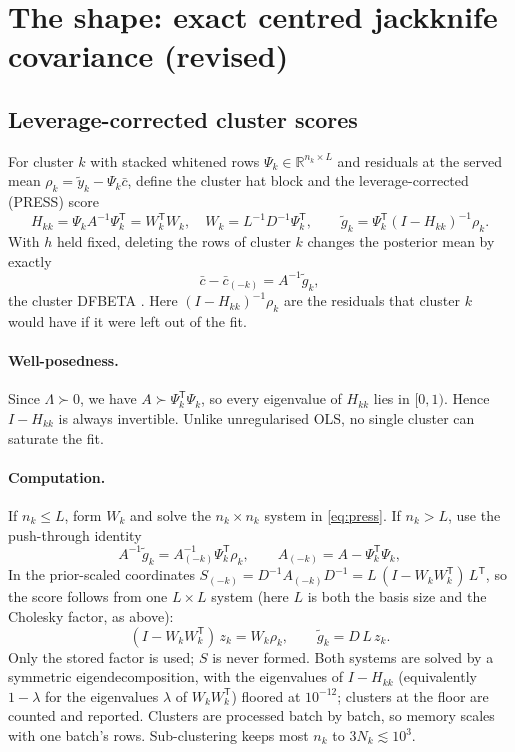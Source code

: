 \documentclass[11pt,a4paper]{article}
\newcommand{\R}{\mathbb{R}}
\newcommand{\T}{\mathsf{T}}
\newcommand{\cbar}{\bar{c}}
\newcommand{\gt}{\tilde{g}}
\begin{document}
\section{The shape: exact centred jackknife covariance (revised)}\label{sec:shape}

\subsection{Leverage-corrected cluster scores}
For cluster $k$ with stacked whitened rows $\Psi_k\in\R^{n_k\times L}$ and residuals at the served mean
$\rho_k=\tilde y_k-\Psi_k\cbar$, define the cluster hat block and the leverage-corrected (PRESS) score
\begin{equation}
H_{kk}=\Psi_kA^{-1}\Psi_k^\T = W_k^\T W_k,\quad W_k=L^{-1}D^{-1}\Psi_k^\T,\qquad
\gt_k=\Psi_k^\T(I-H_{kk})^{-1}\rho_k .
\label{eq:press}
\end{equation}
With $h$ held fixed, deleting the rows of cluster $k$ changes the posterior mean by exactly
\begin{equation}
\cbar-\cbar_{(-k)} = A^{-1}\gt_k,
\label{eq:dfbeta}
\end{equation}
the cluster DFBETA \cite{cook1982}. Here $(I-H_{kk})^{-1}\rho_k$ are the residuals that cluster $k$
would have if it were left out of the fit.

\paragraph{Well-posedness.} Since $\Lambda\succ0$, we have $A\succ\Psi_k^\T\Psi_k$, so every eigenvalue
of $H_{kk}$ lies in $[0,1)$. Hence $I-H_{kk}$ is always invertible. Unlike unregularised OLS, no single
cluster can saturate the fit.

\paragraph{Computation.} If $n_k\le L$, form $W_k$ and solve the $n_k\times n_k$ system in
\eqref{eq:press}. If $n_k>L$, use the push-through identity
\begin{equation}
A^{-1}\gt_k = A_{(-k)}^{-1}\Psi_k^\T\rho_k,\qquad A_{(-k)}=A-\Psi_k^\T\Psi_k,
\end{equation}
In the prior-scaled coordinates $S_{(-k)}=D^{-1}A_{(-k)}D^{-1}=L\,(I-W_kW_k^\T)\,L^\T$, so the score
follows from one $L\times L$ system (here $L$ is both the basis size and the Cholesky factor, as above):
\begin{equation}
(I-W_kW_k^\T)\,z_k=W_k\rho_k,\qquad \gt_k=D\,L\,z_k .
\end{equation}
Only the stored factor is used; $S$ is never formed. Both systems are solved by a symmetric
eigendecomposition, with the eigenvalues of $I-H_{kk}$ (equivalently $1-\lambda$ for the eigenvalues
$\lambda$ of $W_kW_k^\T$) floored at $10^{-12}$; clusters at the floor are counted and reported.
Clusters are processed batch by batch, so memory scales with one batch's rows. Sub-clustering keeps
most $n_k$ to $3N_k\lesssim10^3$.
\end{document}
